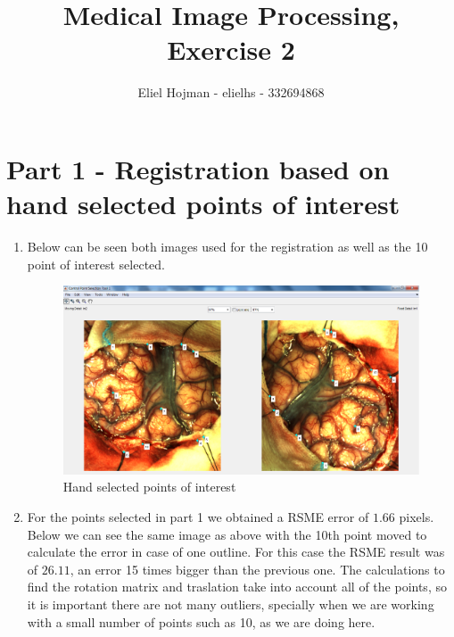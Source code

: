 \documentclass[a4paper,16pt]{article}
\author{Eliel Hojman - elielhs - 332694868}
\title{Medical Image Processing, Exercise 2}
\begin{document}
\maketitle

\section{Part 1 - Registration based on hand selected points of interest}

\begin{enumerate}
\item Below can be seen both images used for the registration as well as the 10 point of interest selected. 
\begin{figure}[H]
	\centering
	\begin{minipage}[b]{0.99\linewidth}
        \includegraphics[width=\linewidth]{selectingPoints.png}
	\end{minipage}
	\caption{Hand selected points of interest}
\end{figure}


\item For the points selected in part 1 we obtained a RSME error of $1.66$ pixels. Below we can see the same image as above with the 10th point moved to calculate the error in case of one outline. For this case the RSME result was of $26.11$, an error 15 times bigger than the previous one. The calculations to find the rotation matrix and traslation take into account all of the points, so it is important there are not many outliers, specially when we are working with a small number of points such as 10, as we are doing here. 


\end{enumerate}
\end{document}
